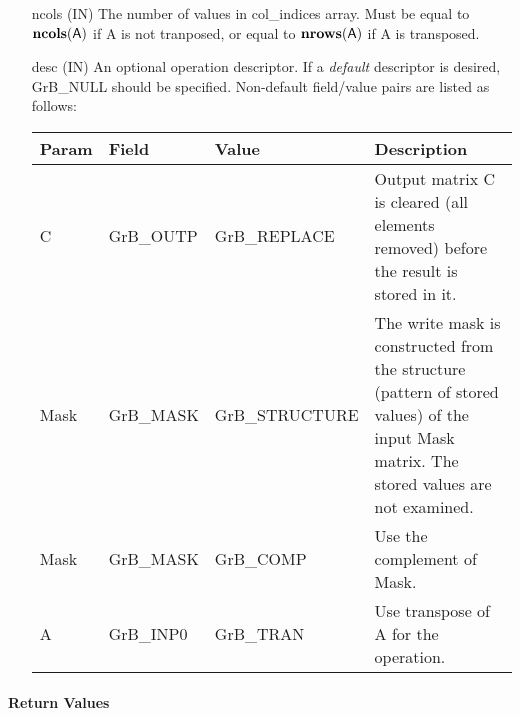 \begin{itemize}[leftmargin=1.1in]
    \item[{\sf ncols}] ({\sf IN}) The number of values in {\sf col\_indices}
    array. Must be equal to $\bold{ncols}({\sf A})$ if {\sf A} is not tranposed,
	or equal to $\bold{nrows}({\sf A})$ if {\sf A} is transposed.

    \item[{\sf desc}] ({\sf IN}) An optional operation descriptor. If
    a \emph{default} descriptor is desired, {\sf GrB\_NULL} should be
    specified. Non-default field/value pairs are listed as follows:  \\

    \hspace*{-2em}\begin{tabular}{lllp{2.7in}}
        Param & Field  & Value & Description \\
        \hline
        {\sf C}    & {\sf GrB\_OUTP} & {\sf GrB\_REPLACE} & Output matrix {\sf C}
        is cleared (all elements removed) before the result is stored in it.\\

        {\sf Mask} & {\sf GrB\_MASK} & {\sf GrB\_STRUCTURE}   & The write mask is
        constructed from the structure (pattern of stored values) of the input
        {\sf Mask} matrix. The stored values are not examined.\\

        {\sf Mask} & {\sf GrB\_MASK} & {\sf GrB\_COMP}   & Use the 
        complement of {\sf Mask}. \\

        {\sf A}    & {\sf GrB\_INP0} & {\sf GrB\_TRAN}   & Use transpose of {\sf A}
        for the operation. \\
    \end{tabular}
\end{itemize}

\paragraph{Return Values}

